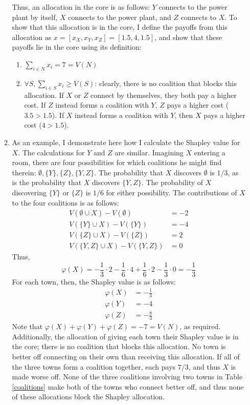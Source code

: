 \documentclass[11pt]{article}
\begin{document}
\begin{enumerate}
\begin{enumerate}
		Thus, an allocation in the core is as follows: \( Y \) connects to the power plant by itself, \( X \) connects to the power plant, and \( Z \) connects to \( X \). To show that this allocation is in the core, I define the payoffs from this allocation as \( x = [x_X, x_Y, x_Z] = [1.5, 4, 1.5] \), and show that these payoffs lie in the core using its definition:
		\begin{enumerate}[label = \roman*.]
			\item \( \sum_{i \in N} x_i = 7 = V(N) \)
			\item \( \forall S, \sum_{i\in S}x_i \geq V(S) \): clearly, there is no coalition that blocks this allocation. If \( X \) or \( Z \) connect by themselves, they both pay a higher cost. If \( Z \) instead forms a coalition with \( Y \), \( Z \) pays a higher cost (\( 3.5 > 1.5 \)). If \( X \) instead forms a coalition with \( Y \), then \( X \) pays a higher cost (\( 4 > 1.5 \)). 
		\end{enumerate}
	\item As an example, I demonstrate here how I calculate the Shapley value for \( X \). The calculations for \( Y \) and \( Z \) are similar. Imagining \( X \) entering a room, there are four possibilities for which coalitions he might find therein: \( \emptyset, \{Y\}, \{Z\}, \{Y,Z\} \). The probability that \( X \) discovers \( \emptyset \) is \( 1/3 \), as is the probability that \( X \) discovers \( \{Y,Z\} \). The probability of \( X \) discovering \( \{Y\} \) or \( \{Z\} \) is \( 1/6 \) for either possibility. The contributions of \( X \) to the four coalitions is as follows:
	\begin{align*}
		V(\emptyset\cup X) - V(\emptyset) &= -2 \\
		V(\{Y\}\cup X) - V(\{Y\}) &= -4 \\
		V(\{Z\}\cup X) - V(\{Z\}) &= 2 \\
		V(\{Y,Z\}\cup X) - V(\{Y,Z\}) &= 0
	\end{align*}
	Thus, 
	\[ \varphi(X) = -\frac{1}{3}\cdot 2 - \frac{1}{6}\cdot 4 + \frac{1}{6}\cdot 2 - \frac{1}{3}\cdot 0 = -\frac{1}{3} \]
	For each town, then, the Shapley value is as follows:
	\begin{align*}
		\varphi(X) &= -\frac{1}{3} \\
		\varphi(Y) &= - 4\\
		\varphi(Z) &= -\frac{8}{3}
	\end{align*}
	Note that \( \varphi(X) + \varphi(Y) + \varphi(Z) = -7 = V(N) \), as required. Additionally, the allocation of giving each town their Shapley value is in the core; there is no coalition that blocks this allocation. No town is better off connecting on their own than receiving this allocation. If all of the three towns form a coalition together, each pays \( 7/3 \), and thus \( X \) is made worse off. None of the three coalitions involving two towns in Table \ref{coalitions} make both of the towns who connect better off, and thus none of these allocations block the Shapley allocation. 


\end{enumerate}
\end{enumerate}
\end{document}
